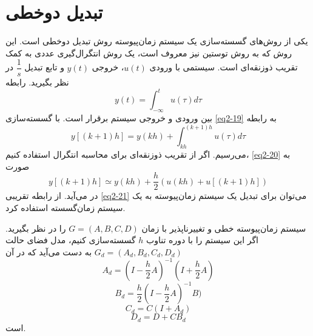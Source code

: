 \chapter{تبدیل دوخطی}

یکی از روش‌های گسسته‌سازی یک سیستم زمان‌پیوسته روش تبدیل دوخطی است. این روش که به روش توستین نیز معروف است، یک روش انتگرال‌گیری عددی به کمک تقریب ذوزنقه‌ای است. سیستمی با ورودی $u(t)$، خروجی $y(t)$ و تابع تبدیل $\dfrac{1}{s}$ در نظر بگیرید. رابطه
\begin{equation}
y(t)=\int_{-\infty}^{t}{u(\tau)} d \tau 
\label{eq2-19}
\end{equation}
بین ورودی و خروجی سیستم برقرار است. با گسسته‌سازی \ref{eq2-19} به رابطه
\begin{equation}
y[(k+1)h]=y(kh)+\int_{kh}^{(k+1)h}{u(\tau)} d \tau 
\label{eq2-20}
\end{equation}
می‌رسیم. اگر از تقریب ذوزنقه‌ای برای محاسبه انتگرال استفاده کنیم، \ref{eq2-20} به صورت 
\begin{equation}
y[(k+1)h] \simeq y(kh)+\dfrac{h}{2}\left(u(kh)+u[(k+1)h]\right)
\label{eq2-21}
\end{equation}
در می‌آید. از رابطه تقریبی \ref{eq2-21} می‌توان برای تبدیل یک سیستم زمان‌پیوسته به یک سیستم زمان‌گسسته استفاده کرد.

سیستم زمان‌پیوسته خطی و تغییرناپذیر با زمان $G=(A,B,C,D)$  را در نظر بگیرید. اگر این سیستم را با دوره تناوب $h$ گسسته‌سازی کنیم، مدل فضای حالت $G_d=(A_d,B_d,C_d,D_d)$ به دست می‌آید که در آن
\begin{equation*}
A_{d}=(I-\dfrac{h}{2}A)^{-1}(I+\dfrac{h}{2}A) 
\end{equation*} 
 \begin{equation*}
B_{d}=\dfrac{h}{2}(I-\dfrac{h}{2}A)^{-1}B) 
\end{equation*} 
  \begin{equation*}
C_{d}=C(I+A_{d}) 
\end{equation*} 
  \begin{equation*}
D_{d}=D+CB_{d} 
\end{equation*} 
 است.
